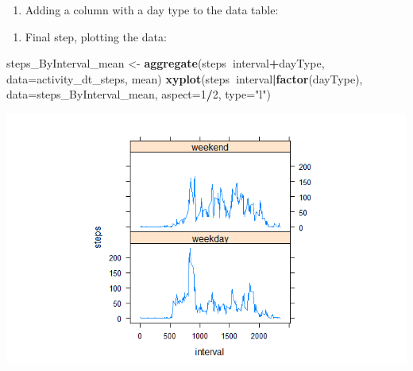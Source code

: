 \documentclass[
]{article}
\newenvironment{Shaded}{\begin{snugshade}}{\end{snugshade}}
\newcommand{\ControlFlowTok}[1]{\textcolor[rgb]{0.13,0.29,0.53}{\textbf{#1}}}
\newcommand{\DataTypeTok}[1]{\textcolor[rgb]{0.13,0.29,0.53}{#1}}
\newcommand{\DecValTok}[1]{\textcolor[rgb]{0.00,0.00,0.81}{#1}}
\newcommand{\KeywordTok}[1]{\textcolor[rgb]{0.13,0.29,0.53}{\textbf{#1}}}
\newcommand{\NormalTok}[1]{#1}
\newcommand{\OperatorTok}[1]{\textcolor[rgb]{0.81,0.36,0.00}{\textbf{#1}}}
\newcommand{\StringTok}[1]{\textcolor[rgb]{0.31,0.60,0.02}{#1}}
\providecommand{\tightlist}{%
  \setlength{\itemsep}{0pt}\setlength{\parskip}{0pt}}
\begin{document}
\begin{enumerate}
\def\labelenumi{\arabic{enumi}.}
\setcounter{enumi}{2}
\tightlist
\item
  Adding a column with a day type to the data table:
\end{enumerate}

\begin{Shaded}
\end{Shaded}

\begin{enumerate}
\def\labelenumi{\arabic{enumi}.}
\setcounter{enumi}{3}
\tightlist
\item
  Final step, plotting the data:
\end{enumerate}

\begin{Shaded}
\begin{Highlighting}[]
\NormalTok{steps_ByInterval_mean <-}\StringTok{ }\KeywordTok{aggregate}\NormalTok{(steps}\OperatorTok{~}\NormalTok{interval}\OperatorTok{+}\NormalTok{dayType, }\DataTypeTok{data=}\NormalTok{activity_dt_steps, mean)}
\KeywordTok{xyplot}\NormalTok{(steps}\OperatorTok{~}\NormalTok{interval}\OperatorTok{|}\KeywordTok{factor}\NormalTok{(dayType), }\DataTypeTok{data=}\NormalTok{steps_ByInterval_mean, }\DataTypeTok{aspect=}\DecValTok{1}\OperatorTok{/}\DecValTok{2}\NormalTok{, }\DataTypeTok{type=}\StringTok{"l"}\NormalTok{)}
\end{Highlighting}
\end{Shaded}

\includegraphics[width=1\linewidth]{./Rplot_4}
\end{document}
